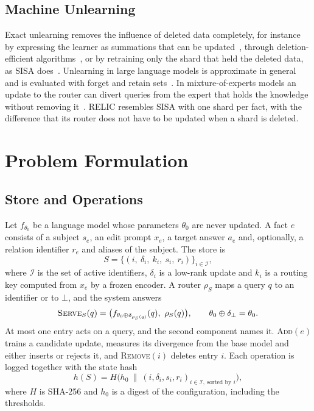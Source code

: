 \documentclass[journal,10pt]{IEEEtran}
\newcommand{\commit}{\textsc{Add}}
\newcommand{\revoke}{\textsc{Remove}}
\newcommand{\serve}{\textsc{Serve}}
\begin{document}
\subsection{Machine Unlearning}
Exact unlearning removes the influence of deleted data completely, for instance by expressing the learner
as summations that can be updated~\cite{cao2015forget}, through deletion-efficient
algorithms~\cite{ginart2019forget}, or by retraining only the shard that held the deleted data, as SISA
does~\cite{bourtoule2021sisa}. Unlearning in large language models is approximate in general and is
evaluated with forget and retain sets~\cite{eldan2023harrypotter,maini2024tofu,shi2025muse,
liu2025rethinking}. In mixture-of-experts models an update to the router can divert queries from the
expert that holds the knowledge without removing it~\cite{zhuang2025seuf,zhu2026grip}. RELIC resembles
SISA with one shard per fact, with the difference that its router does not have to be updated when a shard
is deleted.

\section{Problem Formulation}
\label{sec:problem}

\subsection{Store and Operations}
Let $f_{\theta_0}$ be a language model whose parameters $\theta_0$ are never updated. A fact $e$ consists of
a subject $s_e$, an edit prompt $x_e$, a target answer $a_e$ and, optionally, a relation identifier $r_e$
and aliases of the subject. The store is
\begin{equation}
S=\{(i,\ \delta_i,\ k_i,\ s_i,\ r_i)\}_{i\in\mathcal{I}},
\end{equation}
where $\mathcal{I}$ is the set of active identifiers, $\delta_i$ is a low-rank update and $k_i$ is a routing
key computed from $x_e$ by a frozen encoder. A router $\rho_S$ maps a query $q$ to an identifier or to
$\bot$, and the system answers
\begin{equation}
\serve_S(q)=\big(f_{\theta_0\oplus\delta_{\rho_S(q)}}(q),\ \rho_S(q)\big),\qquad
\theta_0\oplus\delta_\bot=\theta_0 .
\end{equation}
At most one entry acts on a query, and the second component names it. \commit$(e)$ trains a candidate
update, measures its divergence from the base model and either inserts or rejects it, and \revoke$(i)$
deletes entry $i$. Each operation is logged together with the state hash
\begin{equation}
h(S)=H\big(h_0\ \|\ (i,\delta_i,s_i,r_i)_{i\in\mathcal{I},\ \text{sorted by } i}\big),
\end{equation}
where $H$ is SHA-256 and $h_0$ is a digest of the configuration, including the thresholds.
\end{document}
